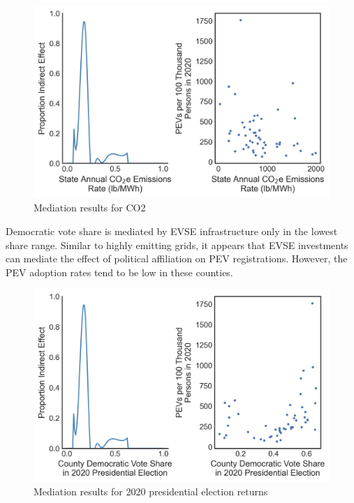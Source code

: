 \documentclass[
  letterpaper,
  DIV=11,
  numbers=noendperiod]{scrartcl}
\begin{document}
\begin{figure}

{\centering \includegraphics{TRB_2023_files/figure-pdf/fig-med-co2-output-1.png}

}

\caption{\label{fig-med-co2}Mediation results for CO2}

\end{figure}

Democratic vote share is mediated by EVSE infrastructure only in the
lowest share range. Similar to highly emitting grids, it appears that
EVSE investments can mediate the effect of political affiliation on PEV
registrations. However, the PEV adoption rates tend to be low in these
counties.

\begin{figure}

{\centering \includegraphics{TRB_2023_files/figure-pdf/fig-med-elect-output-1.png}

}

\caption{\label{fig-med-elect}Mediation results for 2020 presidential
election returns}

\end{figure}
\end{document}
